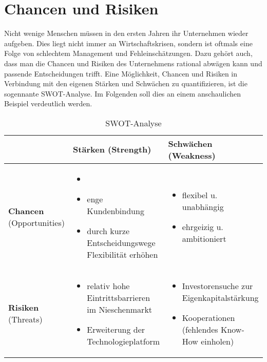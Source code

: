 \chapter{Chancen und Risiken}
Nicht wenige Menschen müssen in den ersten Jahren ihr Unternehmen wieder aufgeben. Dies liegt nicht immer an Wirtschaftskrisen, sondern ist oftmals eine Folge von schlechtem Management und Fehleinschätzungen. Dazu gehört auch, dass man die Chancen und Risiken des Unternehmens rational abwägen kann und passende Entscheidungen trifft. Eine Möglichkeit, Chancen und Risiken in Verbindung mit den eigenen Stärken und Schwächen zu quantifizieren, ist die sogennante SWOT-Analyse. Im Folgenden soll dies an einem anschaulichen Beispiel verdeutlich werden.

\begin{center}
	\begin{table}[htbp!]
	\centering
		\begin{tabular}{| M{2cm} | M{6cm} | M{6cm} |}
		\hline
			\textbf{ } & \textbf{Stärken} (Strength) & \textbf{Schwächen} (Weakness) \\ \hline
			\textbf{Chancen} (Opportunities)
			& \begin{itemize}
				\item []
				\item enge Kundenbindung
				\item durch kurze Entscheidungswege Flexibilität erhöhen
			\end{itemize}
			& \begin{itemize}
				\item flexibel u. unabhängig
				\item ehrgeizig u. ambitioniert
			\end{itemize}
			\\ \hline
			
			\textbf{Risiken} (Threats) 
			& \begin{itemize}
				\item relativ hohe Eintrittsbarrieren im Nieschenmarkt
				\item Erweiterung der Technologieplatform
			\end{itemize}
			& \begin{itemize}
				\item Investorensuche zur Eigenkapitalstärkung
				\item Kooperationen (fehlendes Know-How einholen)
			\end{itemize}
			\\ \hline
		\end{tabular}
		\caption{SWOT-Analyse}
		\label{table:swot}
	\end{table}
\end{center}

